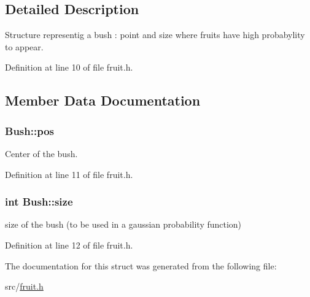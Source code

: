 \subsection{Detailed Description}
Structure representig a bush \-: point and size where fruits have high probabylity to appear. 

Definition at line 10 of file fruit.\-h.



\subsection{Member Data Documentation}
\hypertarget{struct_bush_ab3135be5ff260f0e223cb9c64f4aedc3}{
\subsubsection[{pos}]{ Bush\-::pos}}\label{struct_bush_ab3135be5ff260f0e223cb9c64f4aedc3}


Center of the bush. 



Definition at line 11 of file fruit.\-h.

\hypertarget{struct_bush_a3b40c2cda3c709539246d302e74b8168}{
\subsubsection[{size}]{\setlength{\rightskip}{0pt plus 5cm}int Bush\-::size}}\label{struct_bush_a3b40c2cda3c709539246d302e74b8168}


size of the bush (to be used in a gaussian probability function) 



Definition at line 12 of file fruit.\-h.



The documentation for this struct was generated from the following file\-:\begin{DoxyCompactItemize}
\item 
src/\hyperlink{fruit_8h}{fruit.\-h}\end{DoxyCompactItemize}
